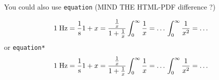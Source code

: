\documentclass{ximera}
\begin{document}
You could also use \verb|equation| (MIND THE HTML-PDF difference ?)

\begin{equation}
    1\; \textrm{Hz}   = \frac{1}{\textrm{s}}          \\
    1 + x             = \frac{\frac1x}{1+\frac{1}{x}} \\
    \int_0^\infty \frac{1}{x}  =  \ldots \\
    \int_0^\infty \frac{1}{x^2}  =  \ldots 
\end{equation}
or \verb|equation*|
\begin{equation*}
    1\; \textrm{Hz}   = \frac{1}{\textrm{s}}          \\
    1 + x             = \frac{\frac1x}{1+\frac{1}{x}} \\
    \int_0^\infty \frac{1}{x}  =  \ldots \\
    \int_0^\infty \frac{1}{x^2}  =  \ldots 
\end{equation*}
\end{document}
